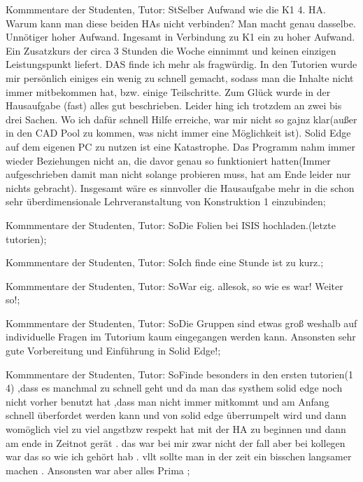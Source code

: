 \documentclass[10pt]{beamer}
\begin{document}
\begin{frame}[fragile]{Kommmentare der Studenten, Tutor: St}Selber Aufwand wie die K1 4. HA. Warum kann man diese beiden HAs nicht verbinden? Man macht genau dasselbe. Unnötiger hoher Aufwand. Ingesamt in Verbindung zu K1 ein zu hoher Aufwand. Ein Zusatzkurs der circa 3 Stunden die Woche einnimmt und keinen einzigen Leistungspunkt liefert. DAS finde ich mehr als fragwürdig.  In den Tutorien wurde mir persönlich einiges ein wenig zu schnell gemacht, sodass man die Inhalte nicht immer mitbekommen hat, bzw. einige Teilschritte. Zum Glück wurde in der Hausaufgabe (fast) alles gut beschrieben. Leider hing ich trotzdem an zwei bis drei Sachen. Wo ich dafür schnell Hilfe erreiche, war mir nicht so gajnz klar(außer in den CAD Pool zu kommen, was nicht immer eine Möglichkeit ist). Solid Edge auf dem eigenen PC zu nutzen ist eine Katastrophe. Das Programm nahm immer wieder Beziehungen nicht an, die davor genau so funktioniert hatten(Immer aufgeschrieben damit man nicht solange probieren muss, hat am Ende leider nur nichts gebracht). Insgesamt wäre es sinnvoller die Hausaufgabe mehr in die schon sehr überdimensionale Lehrveranstaltung von Konstruktion 1 einzubinden;
 \end{frame}
\begin{frame}[fragile]{Kommmentare der Studenten, Tutor: So}Die Folien bei ISIS hochladen.(letzte tutorien);
 \end{frame}
\begin{frame}[fragile]{Kommmentare der Studenten, Tutor: So}Ich finde eine Stunde ist zu kurz.;
 \end{frame}
\begin{frame}[fragile]{Kommmentare der Studenten, Tutor: So}War eig. allesok, so wie es war!
 Weiter so!;
 \end{frame}
\begin{frame}[fragile]{Kommmentare der Studenten, Tutor: So}Die Gruppen sind etwas groß weshalb auf individuelle Fragen im Tutorium kaum eingegangen werden kann. Ansonsten sehr gute Vorbereitung und Einführung in Solid Edge!;
 \end{frame}
\begin{frame}[fragile]{Kommmentare der Studenten, Tutor: So}Finde besonders in den ersten tutorien(1 4) ,dass es manchmal zu schnell geht und da man das systhem solid edge noch nicht vorher benutzt hat ,dass man nicht immer mitkommt und am Anfang schnell überfordet werden kann und von solid edge überrumpelt wird und dann womöglich viel zu viel angstbzw respekt  hat mit der HA zu beginnen und dann am ende in Zeitnot gerät . das war bei mir zwar nicht der fall aber bei kollegen war das so wie ich gehört hab . vllt sollte man in der zeit ein bisschen langsamer machen . Ansonsten war aber alles Prima ;
 \end{frame}
\end{document}
